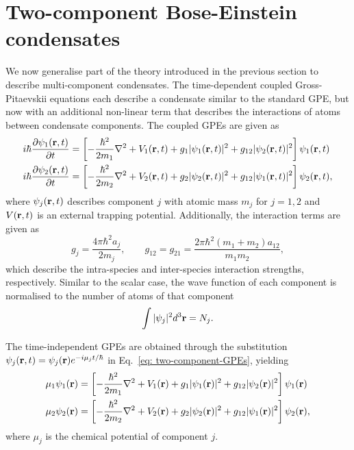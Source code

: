 \section{Two-component Bose-Einstein condensates}
We now generalise part of the theory introduced in the previous section to
describe multi-component condensates.
The time-dependent coupled Gross-Pitaevskii equations each describe a condensate
similar to the standard GPE, but now with an additional non-linear term that
describes the interactions of atoms between condensate components.
The coupled GPEs are given as
\begin{equation}\label{eq: two-component-GPEs}
    \begin{aligned}
        i\hbar \pdv{\psi_1(\vb{r}, t)}{t} &= 
        \left[-\frac{\hbar^2}{2m_1}\nabla^2 + V_1(\vb{r}, t)
        + g_1|\psi_1(\vb{r}, t)|^2 
        + g_{12}|\psi_2(\vb{r}, t)|^2\right]\psi_1(\vb{r}, t) \\
        i\hbar \pdv{\psi_2(\vb{r}, t)}{t} &= 
        \left[-\frac{\hbar^2}{2m_2}\nabla^2 + V_2(\vb{r}, t)
        + g_2|\psi_2(\vb{r}, t)|^2 
        + g_{12}|\psi_1(\vb{r}, t)|^2\right]\psi_2(\vb{r}, t),
    \end{aligned}
\end{equation}
where \(\psi_j(\vb{r}, t)\) describes component \(j\) with atomic mass \(m_j\)
for \(j=1, 2\) and \(V(\vb{r}, t)\) is an external trapping potential.
Additionally, the interaction terms are given as
\begin{equation}
    g_j = \frac{4\pi \hbar^2a_j}{2m_j}, \qquad
    g_{12} = g_{21} = \frac{2\pi\hbar^2(m_1+m_2)a_{12}}{m_1m_2},
\end{equation}
which describe the intra-species and inter-species interaction strengths,
respectively.
Similar to the scalar case, the wave function of each component is normalised
to the number of atoms of that component
\begin{equation}
    \int |\psi_j|^2 d^3\vb{r} = N_j.
\end{equation}

The time-independent GPEs are obtained through the substitution
\(\psi_j(\vb{r}, t)=\psi_j(\vb{r})e^{-i\mu_j t/\hbar}\) in
Eq.~\eqref{eq: two-component-GPEs}, yielding
\begin{equation}\label{eq: time-indep-two-component-GPEs}
    \begin{aligned}
        \mu_1\psi_1(\vb{r}) &= 
        \left[-\frac{\hbar^2}{2m_1}\nabla^2 + V_1(\vb{r})
        + g_1|\psi_1(\vb{r})|^2 
        + g_{12}|\psi_2(\vb{r})|^2\right]\psi_1(\vb{r}) \\
        \mu_2\psi_2(\vb{r}) &= 
        \left[-\frac{\hbar^2}{2m_2}\nabla^2 + V_2(\vb{r})
        + g_2|\psi_2(\vb{r})|^2 
        + g_{12}|\psi_1(\vb{r})|^2\right]\psi_2(\vb{r}),
    \end{aligned}
\end{equation}
where \(\mu_j\) is the chemical potential of component \(j\).

